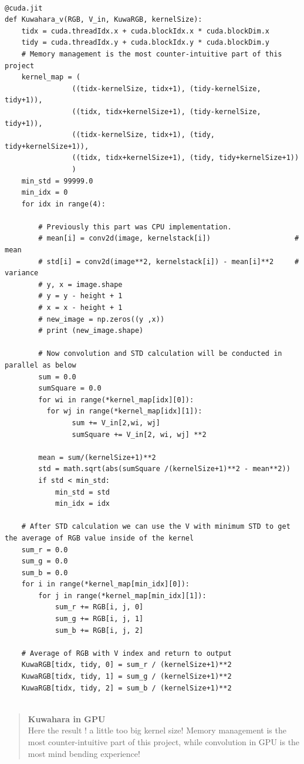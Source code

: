 \documentclass[a4paper,11pt]{article}
\theoremstyle{mytheor}
\begin{document}
\begin{lstlisting}[caption=Kuwahara using V value from HSV]

@cuda.jit
def Kuwahara_v(RGB, V_in, KuwaRGB, kernelSize):
    tidx = cuda.threadIdx.x + cuda.blockIdx.x * cuda.blockDim.x
    tidy = cuda.threadIdx.y + cuda.blockIdx.y * cuda.blockDim.y
    # Memory management is the most counter-intuitive part of this project
    kernel_map = (
                ((tidx-kernelSize, tidx+1), (tidy-kernelSize, tidy+1)),
                ((tidx, tidx+kernelSize+1), (tidy-kernelSize, tidy+1)),
                ((tidx-kernelSize, tidx+1), (tidy, tidy+kernelSize+1)),
                ((tidx, tidx+kernelSize+1), (tidy, tidy+kernelSize+1))
                )
    min_std = 99999.0
    min_idx = 0
    for idx in range(4):
    
        # Previously this part was CPU implementation.
        # mean[i] = conv2d(image, kernelstack[i]) 	                 # mean 
        # std[i] = conv2d(image**2, kernelstack[i]) - mean[i]**2     # variance
        # y, x = image.shape
        # y = y - height + 1
        # x = x - height + 1
        # new_image = np.zeros((y ,x))
        # print (new_image.shape)

        # Now convolution and STD calculation will be conducted in parallel as below
        sum = 0.0
        sumSquare = 0.0
        for wi in range(*kernel_map[idx][0]):
          for wj in range(*kernel_map[idx][1]):
                sum += V_in[2,wi, wj]
                sumSquare += V_in[2, wi, wj] **2
        
        mean = sum/(kernelSize+1)**2
        std = math.sqrt(abs(sumSquare /(kernelSize+1)**2 - mean**2))
        if std < min_std:
            min_std = std
            min_idx = idx

    # After STD calculation we can use the V with minimum STD to get the average of RGB value inside of the kernel
    sum_r = 0.0
    sum_g = 0.0
    sum_b = 0.0
    for i in range(*kernel_map[min_idx][0]):
        for j in range(*kernel_map[min_idx][1]):
            sum_r += RGB[i, j, 0]
            sum_g += RGB[i, j, 1]
            sum_b += RGB[i, j, 2]
    
    # Average of RGB with V index and return to output
    KuwaRGB[tidx, tidy, 0] = sum_r / (kernelSize+1)**2
    KuwaRGB[tidx, tidy, 1] = sum_g / (kernelSize+1)**2
    KuwaRGB[tidx, tidy, 2] = sum_b / (kernelSize+1)**2
    
\end{lstlisting}

\begin{quote}
\textbf{Kuwahara in GPU\\}
Here the result ! a little too big kernel size!
Memory management is the most counter-intuitive part of this project, while convolution in GPU is the most mind bending experience!
\end{quote}
\end{document}
